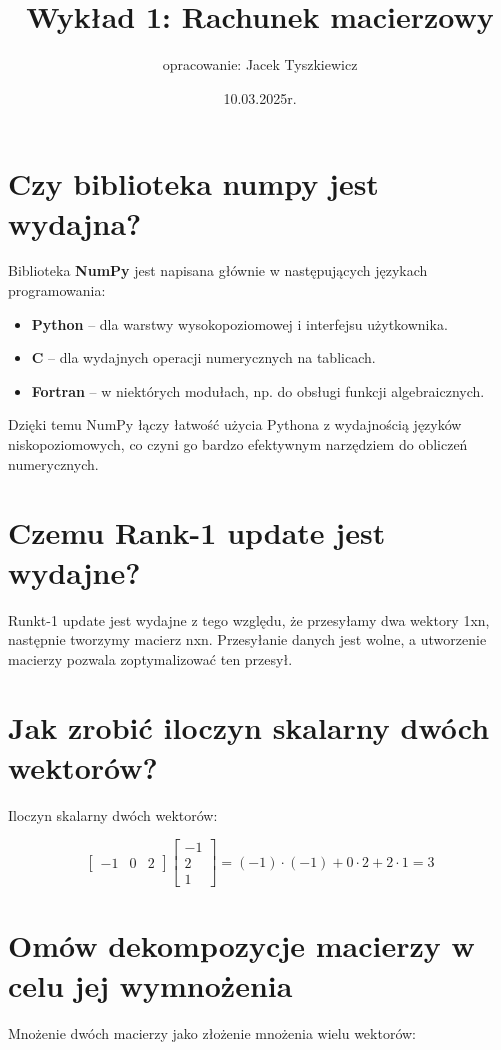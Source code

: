 \documentclass{article}
\title{Wykład 1: Rachunek macierzowy}
\author{opracowanie: Jacek Tyszkiewicz}
\date{10.03.2025r.}
\begin{document}
\maketitle

\section{Czy biblioteka numpy jest wydajna?}

Biblioteka \textbf{NumPy} jest napisana głównie w następujących językach programowania:

\begin{itemize}
    \item \textbf{Python} – dla warstwy wysokopoziomowej i interfejsu użytkownika.
    \item \textbf{C} – dla wydajnych operacji numerycznych na tablicach.
    \item \textbf{Fortran} – w niektórych modułach, np. do obsługi funkcji algebraicznych.
\end{itemize}

Dzięki temu NumPy łączy łatwość użycia Pythona z wydajnością języków niskopoziomowych, co czyni go bardzo efektywnym narzędziem do obliczeń numerycznych.
\section{Czemu Rank-1 update jest wydajne?}
Runkt-1 update jest wydajne z tego względu, że przesyłamy dwa wektory 1xn, następnie tworzymy macierz nxn. Przesyłanie danych jest wolne, a utworzenie macierzy pozwala zoptymalizować ten przesył.
\section{Jak zrobić iloczyn skalarny dwóch wektorów?}
Iloczyn skalarny dwóch wektorów:

\[
\begin{bmatrix} -1 & 0 & 2 \end{bmatrix} 
\begin{bmatrix} -1 \\ 2 \\ 1 \end{bmatrix} 
= (-1) \cdot (-1) + 0 \cdot 2 + 2 \cdot 1 = 3
\]
\newpage
\section{Omów dekompozycje macierzy w celu jej wymnożenia}
Mnożenie dwóch macierzy jako złożenie mnożenia wielu wektorów:
\end{document}
